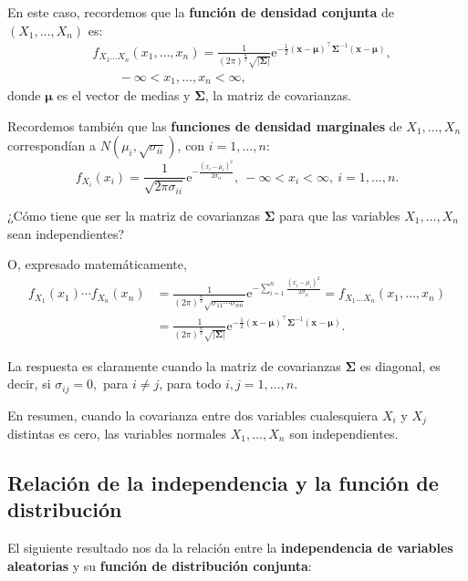 \documentclass[
  letterpaper,
  DIV=11,
  numbers=noendperiod]{scrreprt}
\begin{document}
En este caso, recordemos que la \textbf{función de densidad conjunta} de
\((X_1,\ldots,X_n)\) es: \[
\begin{array}{rl}
& f_{X_1\ldots X_n}(x_1,\ldots,x_n)=\frac{1}{(2\pi)^{\frac{n}{2}}\sqrt{\mathbf{|\Sigma|}}}\mathrm{e}^{-\frac{1}{2}(\mathbf{x-\mu})^\top\mathbf{\Sigma}^{-1}(\mathbf{x-\mu})},\\ & \qquad  -\infty <x_1,\ldots,x_n<\infty,
\end{array}
\] donde \(\mathbf{\mu}\) es el vector de medias y \(\mathbf{\Sigma}\),
la matriz de covarianzas.

Recordemos también que las \textbf{funciones de densidad marginales} de
\(X_1,\ldots, X_n\) correspondían a \(N(\mu_i,\sqrt{\sigma_{ii}})\), con
\(i=1,\ldots, n\): \[
f_{X_i}(x_i)  =\frac{1}{\sqrt{2\pi\sigma_{ii}}}\mathrm{e}^{-\frac{(x_i-\mu_i)^2}{2\sigma_{ii}}},\ -\infty <x_i<\infty,\ i=1,\ldots,n.
\]

¿Cómo tiene que ser la matriz de covarianzas \(\mathbf{\Sigma}\) para
que las variables \(X_1,\ldots,X_n\) sean independientes?

O, expresado matemáticamente, \[
\begin{array}{rl}
f_{X_1}(x_1)\cdots f_{X_n}(x_n) & =\frac{1}{\left(2\pi\right)^{\frac{n}{2}}\sqrt{\sigma_{11}\cdots \sigma_{nn}}}\mathrm{e}^{-\sum\limits_{i=1}^n\frac{(x_i-\mu_i)^2}{2\sigma_{ii}}}=f_{X_1\ldots X_n}(x_1,\ldots,x_n) \\ & =\frac{1}{(2\pi)^{\frac{n}{2}}\sqrt{\mathbf{|\Sigma|}}}\mathrm{e}^{-\frac{1}{2}(\mathbf{x-\mu})^\top\mathbf{\Sigma}^{-1}(\mathbf{x-\mu})}.
\end{array}
\]

La respuesta es claramente cuando la matriz de covarianzas
\(\mathbf{\Sigma}\) es diagonal, es decir, si \(\sigma_{ij}=0,\) para
\(i\neq j\), para todo \(i,j=1,\ldots,n\).

En resumen, cuando la covarianza entre dos variables cualesquiera
\(X_i\) y \(X_j\) distintas es cero, las variables normales
\(X_1,\ldots,X_n\) son independientes.

\hypertarget{relaciuxf3n-de-la-independencia-y-la-funciuxf3n-de-distribuciuxf3n-1}{%
\subsection{Relación de la independencia y la función de
distribución}\label{relaciuxf3n-de-la-independencia-y-la-funciuxf3n-de-distribuciuxf3n-1}}

El siguiente resultado nos da la relación entre la \textbf{independencia
de variables aleatorias} y su \textbf{función de distribución conjunta}:
\end{document}
